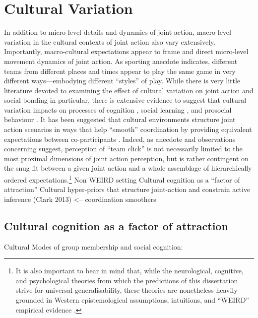  \section{Cultural Variation}
  In addition to micro-level details and dynamics of joint action, macro-level variation in the cultural contexts of joint action also vary extensively. Importantly, macro-cultural expectations appear to frame and direct micro-level movement dynamics of joint action.  As sporting anecdote indicates, different teams from different places and times appear to play the same game in very different ways---embodying different ``styles'' of play.  While there is very little literature devoted to examining the effect of cultural variation on joint action and social bonding in particular, there is extensive evidence to suggest that cultural variation impacts on processes of cognition \citep{Nisbett2003,Hoshino-Browne2005}, social learning \citep{Mesoudi2015}, and prosocial behaviour \citep{Yuki2005,Yuki2003}.
  It has been suggested that cultural environments structure joint action scenarios in ways that help ``smooth'' coordination by providing equivalent expectations between co-participants \citep{Vesper2017}.  Indeed, as anecdote and observations concerning suggest, perception of ``team click'' is not necessarily limited to the most proximal dimensions of joint action perception, but is rather contingent on the snug fit between a given joint action and a whole assemblage of hierarchically ordered expectations.\footnote{It is also important to bear in mind that, while the neurological, cognitive, and psychological theories from which the predictions of this dissertation strive for universal generalisability, these theories are nonetheless heavily grounded in Western epistemological assumptions, intuitions, and ``WEIRD'' empirical evidence \citep{Henrich2010a}.}
    Non WEIRD setting
    Cultural cognition as a ``factor of attraction''
    Cultural hyper-priors that structure joint-action and constrain active inference (Clark 2013) <-- coordination smoothers


  \subsection{Cultural cognition as a factor of attraction}

  Cultural Modes of group membership and social cognition:

